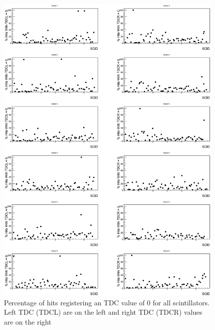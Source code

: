\begin{figure}[!htbp]
    \includegraphics[width=0.99\textwidth]{figures/calib/tof/tofko/tdc.eps}
    \caption{Percentage of hits registering an TDC value of 0 for all scintillators. Left TDC (TDCL) are on the left and right TDC (TDCR) values are on the right}
    \label{plt:tdc0vSCID}
\end{figure}

